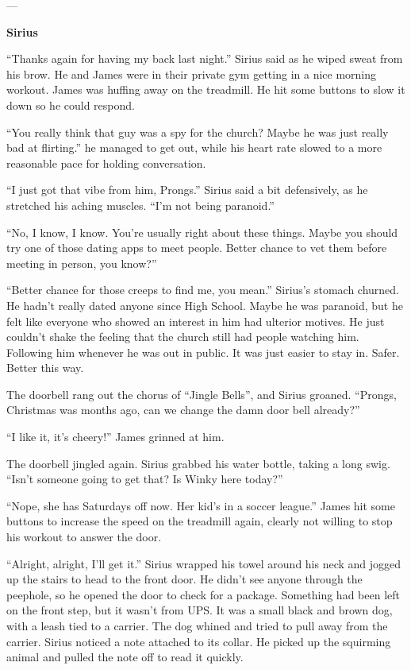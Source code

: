 \documentclass[12pt,twoside,openright]{memoir}
\begin{document}
---

\textbf{Sirius} 

``Thanks again for having my back last night.'' Sirius said as he wiped sweat from his brow. He and James were in their private gym getting in a nice morning workout. James was huffing away on the treadmill. He hit some buttons to slow it down so he could respond.

``You really think that guy was a spy for the church? Maybe he was just really bad at flirting.'' he managed to get out, while his heart rate slowed to a more reasonable pace for holding conversation.

``I just got that vibe from him, Prongs.'' Sirius said a bit defensively, as he stretched his aching muscles. ``I'm not being paranoid.''

``No, I know, I know. You're usually right about these things. Maybe you should try one of those dating apps to meet people. Better chance to vet them before meeting in person, you know?''

``Better chance for those creeps to find me, you mean.'' Sirius's stomach churned. He hadn't really dated anyone since High School. Maybe he was paranoid, but he felt like everyone who showed an interest in him had ulterior motives. He just couldn't shake the feeling that the church still had people watching him. Following him whenever he was out in public. It was just easier to stay in. Safer. Better this way.

The doorbell rang out the chorus of ``Jingle Bells'', and Sirius groaned. ``Prongs, Christmas was months ago, can we change the damn door bell already?''

``I like it, it's cheery!'' James grinned at him. 

The doorbell jingled again. Sirius grabbed his water bottle, taking a long swig. ``Isn't someone going to get that? Is Winky here today?''

``Nope, she has Saturdays off now. Her kid's in a soccer league.'' James hit some buttons to increase the speed on the treadmill again, clearly not willing to stop his workout to answer the door.

``Alright, alright, I'll get it.'' Sirius wrapped his towel around his neck and jogged up the stairs to head to the front door. He didn't see anyone through the peephole, so he opened the door to check for a package. Something had been left on the front step, but it wasn't from UPS. It was a small black and brown dog, with a leash tied to a carrier. The dog whined and tried to pull away from the carrier. Sirius noticed a note attached to its collar. He picked up the squirming animal and pulled the note off to read it quickly.
\end{document}
